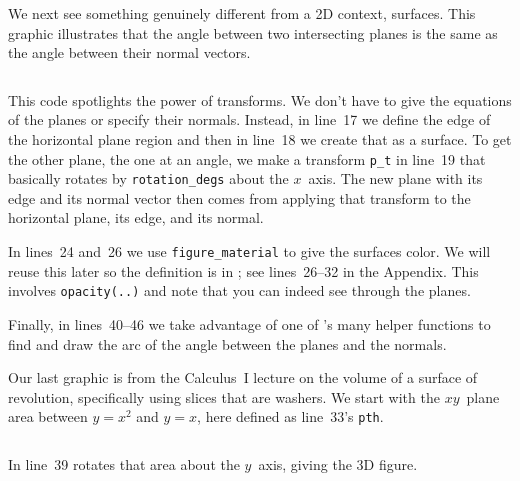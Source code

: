 We next see something 
genuinely different from a 2D context, surfaces.
This graphic illustrates that the angle between two 
intersecting planes is the same as the angle between their normal
vectors. 
\begin{center}
  \vcenteredhbox{ }%
\end{center}  
\begin{center}
  \inputminted{Asymptote}{chapter4/asy/planes.asy}
\end{center}

This code 
spotlights the power of transforms.
We don't have to give the equations of the planes or specify their normals.
Instead, in line~17 we define the edge of 
the horizontal plane region and then in line~18 we create that
as a surface. 
To get the other plane, the one at an angle, 
we make a transform \texttt{p_t} in line~19 
that basically rotates by \texttt{rotation_degs}
about the $x$~axis.
The new plane with its edge and its normal vector 
then comes from applying that transform
to the horizontal plane, its edge, and its normal.

In lines~24 and~26 we use 
\texttt{figure_material} to give the surfaces color.
We will reuse this later so the definition is in ;
see lines~26--32 in the Appendix.
This involves \texttt{opacity(..)} and 
note that you can indeed see through the planes. 

Finally, in lines~40--46 we take advantage of one of \Asy's many helper functions
to find and draw the arc of the angle between the planes and the normals.
 
Our last graphic is from the Calculus~I lecture on the volume of
a surface of revolution, specifically using slices that are
washers.
We start with the $xy$~plane area between $y=x^2$ and $y=x$,
here defined as line~33's \texttt{pth}.
\begin{center}
  \inputminted{Asymptote}{chapter4/asy/washer.asy}
\end{center}
In line~39 \Asy{} rotates that area about the $y$~axis, giving the 3D figure.
\begin{center}
  \vcenteredhbox{ }%
\end{center}  





